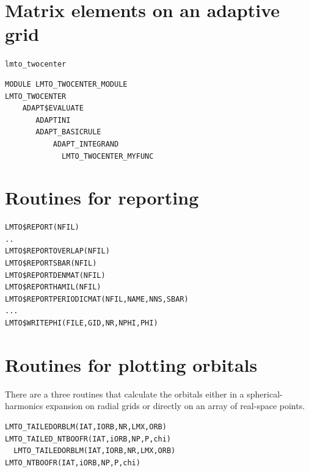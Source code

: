 \documentclass[11pt,a4paper]{report}
\begin{document}
\section{Matrix elements on an adaptive grid}
\verb|lmto_twocenter|

\begin{verbatim}
MODULE LMTO_TWOCENTER_MODULE
LMTO_TWOCENTER
    ADAPT$EVALUATE
       ADAPTINI
       ADAPT_BASICRULE
           ADAPT_INTEGRAND
             LMTO_TWOCENTER_MYFUNC
\end{verbatim}


\section{Routines for reporting}
\begin{verbatim}
LMTO$REPORT(NFIL)
..
LMTO$REPORTOVERLAP(NFIL)
LMTO$REPORTSBAR(NFIL)
LMTO$REPORTDENMAT(NFIL)
LMTO$REPORTHAMIL(NFIL)
LMTO$REPORTPERIODICMAT(NFIL,NAME,NNS,SBAR)
...
LMTO$WRITEPHI(FILE,GID,NR,NPHI,PHI)
\end{verbatim}

\section{Routines for plotting orbitals}
There are a three routines that calculate the orbitals either in a
spherical-harmonics expansion on radial grids or directly on an array
of real-space points.
\begin{verbatim}
LMTO_TAILEDORBLM(IAT,IORB,NR,LMX,ORB)
LMTO_TAILED_NTBOOFR(IAT,iORB,NP,P,chi)
  LMTO_TAILEDORBLM(IAT,IORB,NR,LMX,ORB)
LMTO_NTBOOFR(IAT,iORB,NP,P,chi)
\end{verbatim}
\end{document}
